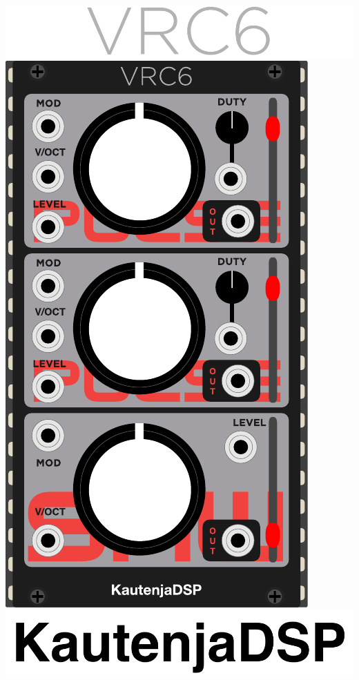 \documentclass[12pt,a4paper]{article}
\begin{document}

\thispagestyle{empty}
\vspace*{\fill}
\begin{center}
\includegraphics{VRC6-Logo}
\linebreak\linebreak\linebreak\linebreak
\includegraphics{VRC6-Module}
\linebreak\linebreak\linebreak\linebreak
\includegraphics{KautenjaDSP}
\end{center}
\vspace*{\fill}
\clearpage
\end{document}
